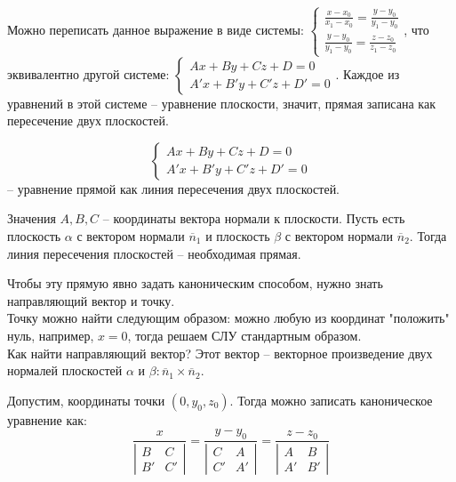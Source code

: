 	Можно переписать данное выражение в виде системы: 
	$ \begin{cases}
		\frac{x - x_0}{x_1 - x_0} = \frac{y - y_0}{y_1 - y_0} \\
		\frac{y - y_0}{y_1 - y_0} = \frac{z - z_0}{z_1 - z_0}
	\end{cases} $, что эквивалентно другой системе:
	$ \begin{cases}
		Ax + By + Cz + D = 0 \\
		A'x + B'y + C'z + D' = 0
	\end{cases} $. Каждое из уравнений в этой системе -- уравнение плоскости, значит, прямая записана как пересечение двух плоскостей.

	\begin{Def}
		$$ \begin{cases}
			Ax + By + Cz + D = 0 \\
			A'x + B'y + C'z + D' = 0
		\end{cases} $$ -- уравнение прямой как линия пересечения двух плоскостей.
	\end{Def}

	Значения $A, B, C$ -- координаты вектора нормали к плоскости. 
	Пусть есть плоскость $\alpha$ с вектором нормали $\overline{n}_1$ и плоскость $\beta$ с вектором нормали $\overline{n}_2$. Тогда линия пересечения плоскостей -- необходимая прямая. 
	
	\begin{figure*}[h]
		\centering
		\def\svgwidth{0.25\columnwidth}
		
	\end{figure*}

	Чтобы эту прямую явно задать каноническим способом, нужно знать направляющий вектор и точку. \\
	Точку можно найти следующим образом: можно любую из координат "положить" нуль, например, $x = 0$, тогда решаем СЛУ стандартным образом.\\
	Как найти направляющий вектор? Этот вектор -- векторное произведение двух нормалей плоскостей $\alpha$ и $\beta: \overline{n}_1 \times \overline{n}_2$.
	
	\begin{Example}
		Допустим, координаты точки $(0, y_0, z_0)$. Тогда можно записать каноническое уравнение как:
		$$\frac{x}{
			\left|\begin{array}{cccc}
				B & C \\ 
				B' & C'
				\end{array}\right| 
		} = \frac{y - y_0}{
			\left|\begin{array}{cccc}
				C & A \\ 
				C' & A'
				\end{array}\right| 
		} = \frac{z - z_0}{
			\left|\begin{array}{cccc}
				A & B \\ 
				A' & B'
				\end{array}\right| 
		}
		$$
	\end{Example}

